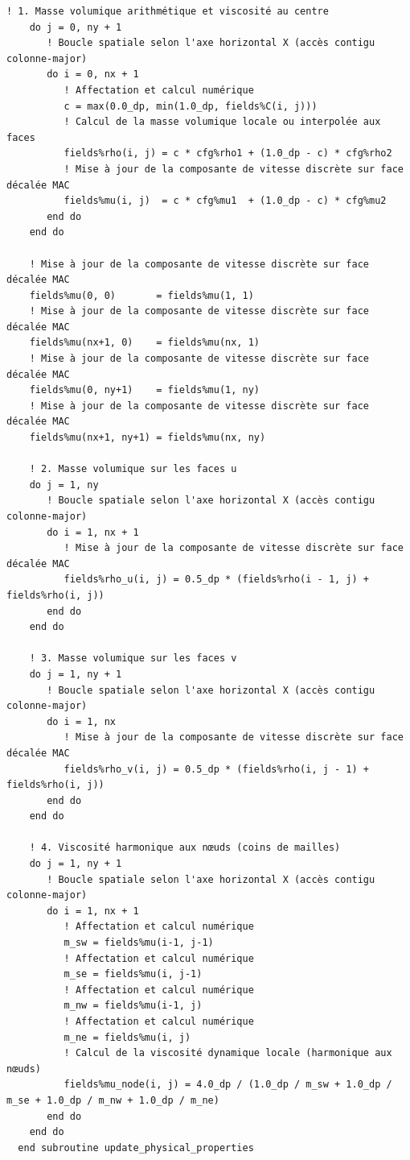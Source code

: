 \documentclass[10pt,a4paper,oneside]{book}
\begin{document}
\begin{lstlisting}[language={[95]Fortran}]
    ! 1. Masse volumique arithmétique et viscosité au centre
    do j = 0, ny + 1
       ! Boucle spatiale selon l'axe horizontal X (accès contigu colonne-major)
       do i = 0, nx + 1
          ! Affectation et calcul numérique
          c = max(0.0_dp, min(1.0_dp, fields%C(i, j)))
          ! Calcul de la masse volumique locale ou interpolée aux faces
          fields%rho(i, j) = c * cfg%rho1 + (1.0_dp - c) * cfg%rho2
          ! Mise à jour de la composante de vitesse discrète sur face décalée MAC
          fields%mu(i, j)  = c * cfg%mu1  + (1.0_dp - c) * cfg%mu2
       end do
    end do

    ! Mise à jour de la composante de vitesse discrète sur face décalée MAC
    fields%mu(0, 0)       = fields%mu(1, 1)
    ! Mise à jour de la composante de vitesse discrète sur face décalée MAC
    fields%mu(nx+1, 0)    = fields%mu(nx, 1)
    ! Mise à jour de la composante de vitesse discrète sur face décalée MAC
    fields%mu(0, ny+1)    = fields%mu(1, ny)
    ! Mise à jour de la composante de vitesse discrète sur face décalée MAC
    fields%mu(nx+1, ny+1) = fields%mu(nx, ny)

    ! 2. Masse volumique sur les faces u
    do j = 1, ny
       ! Boucle spatiale selon l'axe horizontal X (accès contigu colonne-major)
       do i = 1, nx + 1
          ! Mise à jour de la composante de vitesse discrète sur face décalée MAC
          fields%rho_u(i, j) = 0.5_dp * (fields%rho(i - 1, j) + fields%rho(i, j))
       end do
    end do

    ! 3. Masse volumique sur les faces v
    do j = 1, ny + 1
       ! Boucle spatiale selon l'axe horizontal X (accès contigu colonne-major)
       do i = 1, nx
          ! Mise à jour de la composante de vitesse discrète sur face décalée MAC
          fields%rho_v(i, j) = 0.5_dp * (fields%rho(i, j - 1) + fields%rho(i, j))
       end do
    end do

    ! 4. Viscosité harmonique aux nœuds (coins de mailles)
    do j = 1, ny + 1
       ! Boucle spatiale selon l'axe horizontal X (accès contigu colonne-major)
       do i = 1, nx + 1
          ! Affectation et calcul numérique
          m_sw = fields%mu(i-1, j-1)
          ! Affectation et calcul numérique
          m_se = fields%mu(i, j-1)
          ! Affectation et calcul numérique
          m_nw = fields%mu(i-1, j)
          ! Affectation et calcul numérique
          m_ne = fields%mu(i, j)
          ! Calcul de la viscosité dynamique locale (harmonique aux nœuds)
          fields%mu_node(i, j) = 4.0_dp / (1.0_dp / m_sw + 1.0_dp / m_se + 1.0_dp / m_nw + 1.0_dp / m_ne)
       end do
    end do
  end subroutine update_physical_properties


\end{lstlisting}
\end{document}
